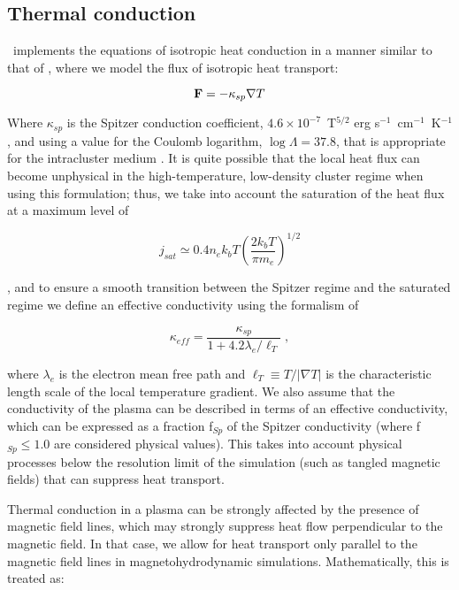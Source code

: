 \subsection{Thermal conduction}
\label{sec.num.conductions}

\enzo\ implements the equations of isotropic heat conduction in a manner
similar to that of \citet{2007ApJ...664..135P}, where we model the
flux of isotropic heat transport:

\begin{equation}
\myvec{F} = -\kappa_{sp} \nabla T
\end{equation}

Where $\kappa_{sp}$ is the Spitzer conduction coefficient, $4.6 \times 10^{-7}$~T$^{5/2}$ erg
s$^{-1}$~cm$^{-1}$~K$^{-1}$ \citep{1962pfig.book.....S}, and using a
value for the Coulomb logarithm, $\log \Lambda = 37.8$, that is
appropriate for the intracluster medium \citep{1988xrec.book.....S}.
It is quite possible that the local heat flux can become unphysical in
the high-temperature, low-density cluster regime when using this
formulation; thus, we take into account the saturation of the heat
flux at a maximum level of

\begin{equation}
j_{sat} \simeq 0.4 n_e k_b T \left( \frac{2 k_b T}{\pi m_e} \right)^{1/2}
\end{equation}

\citep{1977ApJ...211..135C}, and to ensure a smooth transition between
the Spitzer regime and the saturated regime we define an effective
conductivity using the formalism of \citet{1988xrec.book.....S}

\begin{equation}
\kappa_{eff} = \frac{\kappa_{sp}}{1 + 4.2 \lambda_e / \ell_T} \; ,
\end{equation}

where $\lambda_e$ is the electron mean free path and $\ell_T \equiv T
/ |\nabla T|$ is the characteristic length scale of the local
temperature gradient.  We also assume that the conductivity of the
plasma can be described in terms of an effective conductivity, which
can be expressed as a fraction f$_{Sp}$ of the Spitzer conductivity
(where f$_{Sp} \leq 1.0$ are considered physical values).  This takes
into account physical processes below the resolution limit of the
simulation (such as tangled magnetic fields) that can suppress heat
transport.

Thermal conduction in a plasma can be strongly affected by the
presence of magnetic field lines, which may strongly suppress heat
flow perpendicular to the magnetic field.  In that case, we allow for
heat transport only parallel to the magnetic field lines in
magnetohydrodynamic simulations.  Mathematically, this is treated as:


